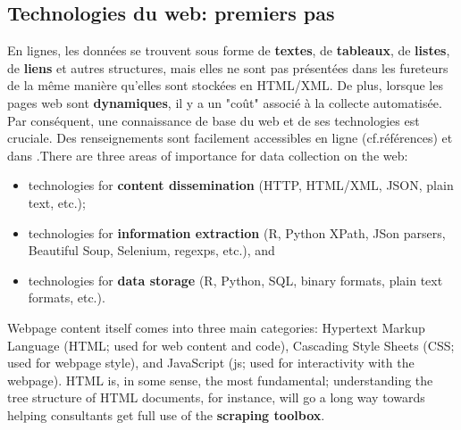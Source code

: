 \subsection{Technologies du web: premiers pas}
En lignes, les données se trouvent sous forme de \textbf{textes}, de \textbf{tableaux}, de \textbf{listes}, de \textbf{liens} et autres structures, mais elles ne sont pas présentées dans les fureteurs de la même manière qu'elles sont stockées en HTML/XML. De plus, lorsque les pages web sont \textbf{dynamiques}, il y a un "coût" associé à la collecte automatisée. Par conséquent, une connaissance de base du web et de ses technologies est cruciale. Des renseignements sont facilement accessibles en ligne (cf.\@ références) et dans \cite{DC_M,DC_MRMN}.\newpage\noindent There are three areas of importance for data collection on the web:
\begin{itemize}[noitemsep]
\item technologies for \textbf{content dissemination} (HTTP, HTML/XML, JSON, plain text, etc.);
\item technologies for \textbf{information extraction} (R, Python XPath, JSon parsers, Beautiful Soup, Selenium, regexps, etc.), and 
\item technologies for \textbf{data storage} (R, Python, SQL, binary formats, plain text formats, etc.).
\end{itemize}
Webpage content itself comes into three main categories: Hypertext Markup Language (HTML; used for web content and code), Cascading Style Sheets (CSS; used for webpage style), and 
JavaScript (js; used for interactivity with the webpage). HTML is, in some sense, the most fundamental; understanding the tree structure of HTML documents, for instance, will go a long way towards helping consultants get full use of the \textbf{scraping toolbox}. 
